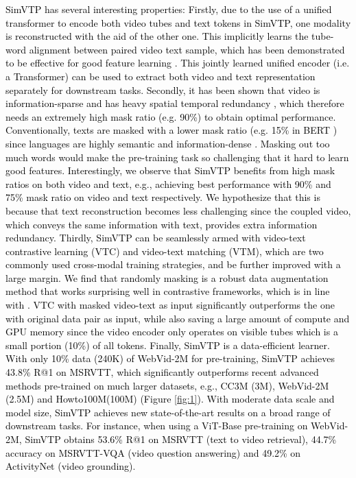 \documentclass[10pt,twocolumn,letterpaper]{article}
\newcommand{\yty}[1]{\textcolor{black}{#1}}
\begin{document}
\yty{SimVTP has several interesting properties: 
	Firstly, due to the use of a unified transformer to encode both video tubes and text tokens in SimVTP,  one modality is reconstructed with the aid of the other one. This implicitly learns the tube-word alignment between paired video text sample, which has been demonstrated to be effective for good feature learning \cite{li2022align, li2021align}.  This jointly learned unified encoder (i.e. a Transformer) can be used to extract both video and text representation separately for downstream tasks. 
	Secondly, it has been shown that video is information-sparse and has heavy spatial temporal redundancy \cite{tong2022videomae}, which therefore needs an extremely high mask ratio (e.g. 90\%) to obtain optimal performance.  Conventionally, texts are masked with a lower mask ratio (e.g. 15\% in BERT \cite{devlin2018bert}) since languages are highly semantic and information-dense \cite{he2022masked}. Masking out too much words would make the pre-training task so challenging that it hard to learn good features. Interestingly, we observe that SimVTP benefits from high mask ratios on both video and text, e.g.,  achieving best performance with 90\% and 75\% mask ratio on video and text respectively. We hypothesize that this is because that text reconstruction becomes less challenging since the coupled video, which conveys the same information with text,  provides extra information redundancy. 
	Thirdly, SimVTP can be seamlessly armed with video-text contrastive learning (VTC) and video-text matching (VTM), which are two commonly used cross-modal training strategies, and be further improved with a large margin. We find that randomly masking is a robust data augmentation method that works surprising well in contrastive frameworks, which is in line with \cite{jing2022masked}. VTC with masked video-text as input significantly outperforms the one with original data pair as input, while also saving a large amount of compute and GPU memory since the video encoder only operates on visible tubes which is a small portion (10\%) of all tokens.
	Finally, SimVTP is a data-efficient learner. With only 10\% data (240K) of WebVid-2M for pre-training, SimVTP achieves 43.8\% R@1 on MSRVTT, which significantly outperforms recent advanced methods\cite{bain2021frozen, wang2022object, cao2022locvtp} pre-trained on much larger datasets, e.g., CC3M (3M), WebVid-2M (2.5M) and Howto100M(100M) (Figure \ref{fig:1}). With moderate data scale and model size, SimVTP achieves new state-of-the-art results on a broad range of downstream tasks. For instance, when using a ViT-Base pre-training on WebVid-2M,  SimVTP obtains 53.6\% R@1 on MSRVTT (text to video retrieval), 44.7\% accuracy on MSRVTT-VQA (video question answering) and 49.2\% on ActivityNet (video grounding)}.
\end{document}
